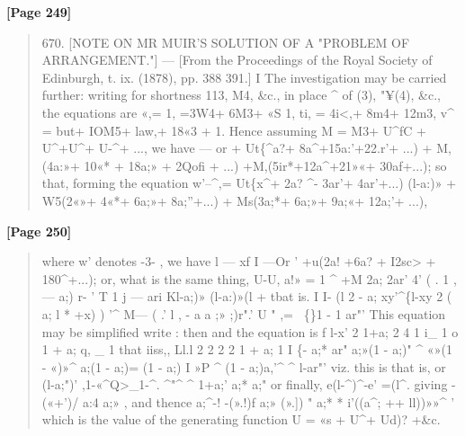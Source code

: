 \documentclass[11pt,a4paper]{book}
\begin{document}
\textbf{[Page 249]}\\[0.2cm]
\begin{quote}
670.
[NOTE ON MR MUIR'S SOLUTION OF A "PROBLEM OF
ARRANGEMENT."]
---
[From the Proceedings of the Royal Society of Edinburgh, t. ix. (1878), pp. 388 391.]
I
The investigation may be carried further: writing for shortness 113, M4, \&c., in place
\textasciicircum{}
of (3), "¥(4), \&c., the equations are
«,=
1,
=3W4+ 6M3+
«S 1,
ti, = 4i<,+ 8m4+ 12m3,
v\textasciicircum{} = but+ IOM5+ law,+ 18«3 + 1.
Hence assuming
M = M3+ U\textasciicircum{}fC + U\textasciicircum{}+U\textasciicircum{}+ U-\textasciicircum{}+ ...,
we have
---
or
+ Ut\{\textasciicircum{}a?+ 8a\textasciicircum{}+15a:'+22.r'+ ...)
+ M,(4a:»+ 10«* + 18a;» + 2Qofi + ...)
+M,(5ir*+12a\textasciicircum{}+21»«+ 30af+...);
so that, forming the equation
w'--\textasciicircum{},= Ut\{x\textasciicircum{}+ 2a? \textasciicircum{}- 3ar'+ 4ar'+...)
(l-a:)»
+ W5(2«»+ 4«*+ 6a;»+ 8a;''+...)
+ Ms(3a;*+ 6a;»+ 9a;«+ 12a;'+ ...),
\end{quote}

\textbf{[Page 250]}\\[0.2cm]
\begin{quote}
where w' denotes -3- , we have
l --- xf I ---Or '
+u(2a! +6a? + I2sc> + 180\textasciicircum{}+...);
or, what is the same thing,
U-U, a!» = 1 \textasciicircum{} +M 2a; 2ar' 4'
( . 1 , --- a;) r- ' T 1 j --- ari Kl-a;)» (l-a:)»(l +
tbat is.
I I- (l 2 - a; xy'\textasciicircum{}\{l-xy 2 ( a; l * +x) ) '\textasciicircum{} M--- ( .' l , - a a ;» ;)r".' U " ,= ~\{\}1 - 1 ar"'
This equation may be simplified write
:
then
and the equation is
f l-x' 2 1+a; 2 4 1 i\_ 1 o 1 + a; q, \_ 1
that iiss,,
Ll.l 2 2 2 2 1 + a; 1
I \{- a;* ar" a;»(1 - a;)" \textasciicircum{} «»(1 - «)»\textasciicircum{} a;(1 - a;)= (1 - a;) I »P \textasciicircum{} (1 - a;)a,'\textasciicircum{} \textasciicircum{} l-ar"'
viz. this is
that is,
or
(l-a;")' ,1-«\textasciicircum{}Q>\_1-\textasciicircum{}.
\textasciicircum{}"\textasciicircum{} \textasciicircum{} 1+a;'
a;* a;"
or finally,
e(l-\textasciicircum{})\textasciicircum{}-e' =(l\textasciicircum{}.
giving
-(«+')/ a:4
a;» ,
and thence
a;\textasciicircum{}-! -(».!)f a;» (».])
" a;* * i'((a\textasciicircum{}; ++ ll))»»\textasciicircum{} '
which is the value of the generating function
U = «s + U\textasciicircum{}+ Ud)? +\&c.
\end{quote}

\newpage
\clearpage


\thispagestyle{empty}
\end{document}
